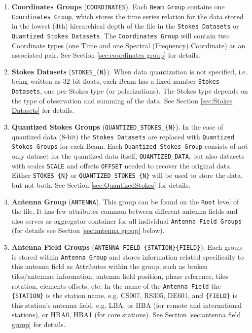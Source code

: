\documentclass[a4paper,10pt,bibtotoc]{scrartcl}
\begin{document}
\begin{enumerate}
\item \textbf{Coordinates Groups} (\verb|COORDINATES|).  Each \texttt{Beam Group} contains
  one \texttt{Coordinates Group}, which stores the time series
  relation for the data stored in the lowest (4th) hierarchical depth
  of the file in the \texttt{Stokes Datasets} or \texttt{Quantized Stokes Datasets}.  The \texttt{Coordinates
    Group} will contain two Coordinate types (one Time and one
  Spectral (Frequency) Coordinate) as an associated pair.  See Section
  \ref{sec:coordinates group} for details.

\item \textbf{Stokes Datasets} (\verb|STOKES_{N}|). When data quantization is not specified, i.e. being written as 32-bit floats, each Beam has a fixed number
  \texttt{Stokes Datasets}, one per Stokes type (or polarizations). The Stokes type depends on the type of observation and summing of the data. See Section \ref{sec:Stokes Datasets} for details.

\item \textbf{Quantized Stokes Groups} (\verb|QUANTIZED_STOKES_{N}|). In the case of quantized data (8-bit) the \texttt{Stokes Datasets}
are replaced with \texttt{Quantized Stokes Groups} for each Beam. Each \texttt{Quantized Stokes Group} consists of not only dataset for the quantized data itself,
\verb|QUANTIZED_DATA|, but also datasets with scales \verb|SCALE| and offsets \verb|OFFSET| needed to recover the original data.
Either \verb|STOKES_{N}| or \verb|QUANTIZED_STOKES_{N}| will be used to store the data, but not both. See Section \ref{sec:QuantizedStokes} for details.

\item \textbf{Antenna Group} (\verb|ANTENNA|). This group can be found on the \texttt{Root} level of the file. It has few attributes common between different antenna fields and also serves as aggregator container for all individual \texttt{Antenna Field Groups} (for details see Section \ref{sec:antenna group} below).

\item \textbf{Antenna Field Groups} (\verb|ANTENNA_FIELD_{STATION}{FIELD}|). Each group is stored within \texttt{Antenna Group} and stores information related specifically to this antenna field as Attributes within the group, such as broken tiles/antennae information, antenna field position, phase reference, tiles rotation, elements offsets, etc. In the name of the \texttt{Antenna Field} the \verb|{STATION}| is the station name, e.g. CS007, RS305, DE601, and \verb|{FIELD}| is this station's antenna field, e.g. LBA, or HBA (for remote and international stations), or HBA0, HBA1 (for core stations). See Section \ref{sec:antenna field group} for details.


\end{enumerate}
\end{document}
